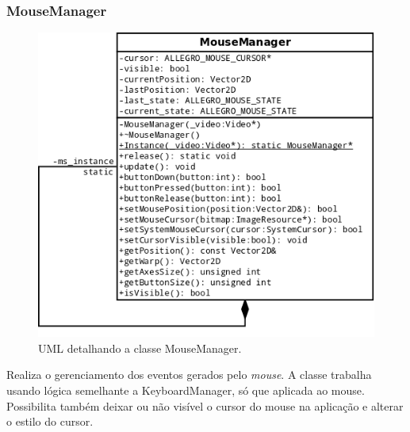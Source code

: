 \subsubsection{MouseManager}
%
%
\begin{figure}[H]
    \centering
		\caption{UML detalhando a classe MouseManager.}
    \label{MouseManager}
    \includegraphics[scale = 0.50]{uml/MouseManager.png}
\end{figure}
%
%
Realiza o gerenciamento dos eventos gerados pelo \textit{mouse}. A classe trabalha usando lógica semelhante a KeyboardManager, só que aplicada ao mouse. Possibilita também deixar ou não visível o cursor do mouse na aplicação e alterar o estilo do cursor.
%
%
